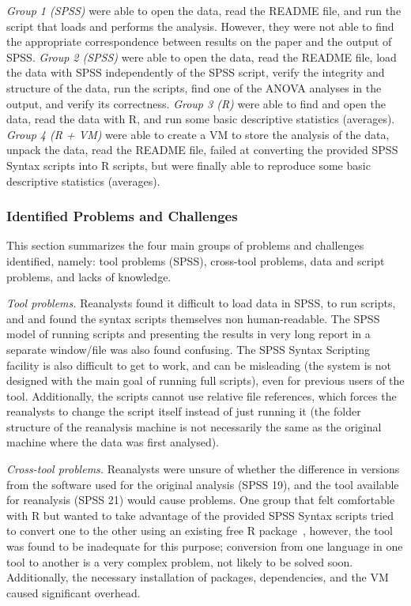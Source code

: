 \emph{Group 1 (SPSS)} were able to open the data, read the README file, and run the script that loads and performs the analysis. However, they were not able to find the appropriate correspondence between results on the paper and the output of SPSS. 
\emph{Group 2 (SPSS)} were able to open the data, read the README file, load the data with SPSS independently of the SPSS script, verify the integrity and structure of the data, run the scripts, find one of the ANOVA analyses in the output, and verify its correctness.
\emph{Group 3 (R)} were able to find and open the data, read the data with R, and run some basic descriptive statistics (averages).
\emph{Group 4 (R + VM)} were able to create a VM to store the analysis of the data, unpack the data, read the README file, failed at converting the provided SPSS Syntax scripts into R scripts, but were finally able to reproduce some basic descriptive statistics (averages).

\subsubsection{Identified Problems and Challenges}
This section summarizes the four main groups of problems and challenges identified, namely: tool problems (SPSS), cross-tool problems, data and script problems, and lacks of knowledge.

\emph{Tool problems.} Reanalysts found it difficult to load data in SPSS, to run scripts, and and found the syntax scripts themselves non human-readable. The SPSS model of running scripts and presenting the results in very long report in a separate window/file was also found confusing. The SPSS Syntax Scripting facility is also difficult to get to work, and can be misleading (the system is not designed with the main goal of running full scripts), even for previous users of the tool. Additionally, the scripts cannot use relative file references, which forces the reanalysts to change the script itself instead of just running it (the folder structure of the reanalysis machine is not necessarily the same as the original machine where the data was first analysed). 

\emph{Cross-tool problems.} Reanalysts were unsure of whether the difference in
versions from the software used for the original analysis (SPSS 19), and the
tool available for reanalysis (SPSS 21) would cause problems. One group that
felt comfortable with R but wanted to take advantage of the provided SPSS Syntax
scripts tried to convert one to the other using an existing free
R package~\cite{spsstor}, however, the tool was found to be inadequate for this purpose; conversion from one language in one tool to another is a very complex problem, not likely to be solved soon. Additionally, the necessary installation of packages, dependencies, and the VM caused significant overhead.

